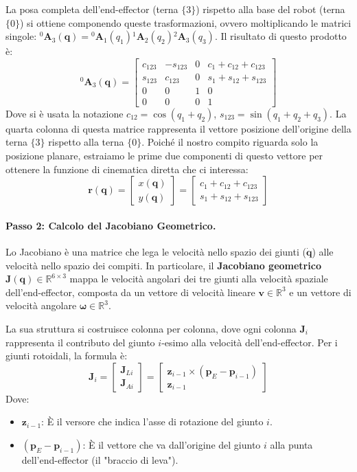 ﻿\documentclass[11pt, a4paper]{article}
\begin{document}
La posa completa dell'end-effector (terna $\{3\}$) rispetto alla base del robot (terna $\{0\}$) si ottiene componendo queste trasformazioni, ovvero moltiplicando le matrici singole: ${}^0\bm{A}_3(\bm{q}) = {}^0\bm{A}_1(q_1) {}^1\bm{A}_2(q_2) {}^2\bm{A}_3(q_3)$. Il risultato di questo prodotto è:
\[
    {}^0\bm{A}_3(\bm{q}) =
    \begin{bmatrix}
        c_{123} & -s_{123} & 0 & c_1 + c_{12} + c_{123} \\
        s_{123} & c_{123} & 0 & s_1 + s_{12} + s_{123} \\
        0 & 0 & 1 & 0 \\
        0 & 0 & 0 & 1
    \end{bmatrix}
\]
Dove si è usata la notazione $c_{12} = \cos(q_1+q_2)$, $s_{123} = \sin(q_1+q_2+q_3)$. La quarta colonna di questa matrice rappresenta il vettore posizione dell'origine della terna $\{3\}$ rispetto alla terna $\{0\}$. Poiché il nostro compito riguarda solo la posizione planare, estraiamo le prime due componenti di questo vettore per ottenere la funzione di cinematica diretta che ci interessa:
\[
    \bm{r}(\bm{q}) =
    \begin{bmatrix} x(\bm{q}) \\ y(\bm{q}) \end{bmatrix} =
    \begin{bmatrix}
        c_1 + c_{12} + c_{123} \\
        s_1 + s_{12} + s_{123}
    \end{bmatrix}
\]

\paragraph{Passo 2: Calcolo del Jacobiano Geometrico.}
Lo Jacobiano è una matrice che lega le velocità nello spazio dei giunti ($\dot{\bm{q}}$) alle velocità nello spazio dei compiti. In particolare, il \textbf{Jacobiano geometrico} $\bm{J}(\bm{q}) \in \mathbb{R}^{6 \times 3}$ mappa le velocità angolari dei tre giunti alla velocità spaziale dell'end-effector, composta da un vettore di velocità lineare $\bm{v} \in \mathbb{R}^3$ e un vettore di velocità angolare $\bm{\omega} \in \mathbb{R}^3$.

La sua struttura si costruisce colonna per colonna, dove ogni colonna $\bm{J}_i$ rappresenta il contributo del giunto $i$-esimo alla velocità dell'end-effector. Per i giunti rotoidali, la formula è:
\[
\bm{J}_i =
\begin{bmatrix} \bm{J}_{Li} \\ \bm{J}_{Ai} \end{bmatrix} =
\begin{bmatrix} \bm{z}_{i-1} \times (\bm{p}_E - \bm{p}_{i-1}) \\ \bm{z}_{i-1} \end{bmatrix}
\]
Dove:
\begin{itemize}
    \item $\bm{z}_{i-1}$: È il versore che indica l'asse di rotazione del giunto $i$.
    \item $(\bm{p}_E - \bm{p}_{i-1})$: È il vettore che va dall'origine del giunto $i$ alla punta dell'end-effector (il "braccio di leva").
\end{itemize}
\end{document}

